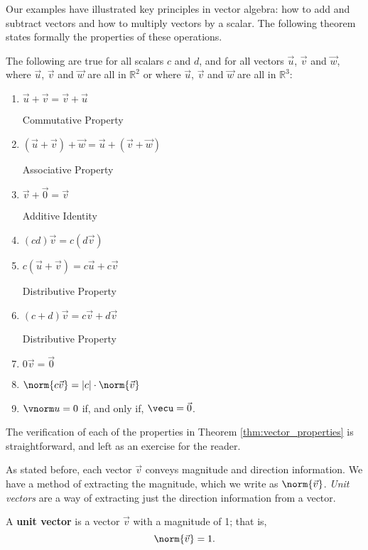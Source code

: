 Our examples have illustrated key principles in vector algebra: how to add and subtract vectors and how to multiply vectors by a scalar. The following theorem states formally the properties of these operations.

{The following are true for all scalars $c$ and $d$, and for all vectors $\vec u$, $\vec v$ and $\vec w$, where $\vec u$, $\vec v$ and $\vec w$ are all in $\mathbb{R}^2$ or where $\vec u$, $\vec v$ and $\vec w$ are all in $\mathbb{R}^3$:
\begin{enumerate}
	\item \parbox{150pt}{$\vec u+\vec v = \vec v+\vec u$}Commutative Property
	\item \parbox{150pt}{$(\vec u+\vec v)+\vec w = \vec u+(\vec v+\vec w)$}Associative Property
	\item \parbox{150pt}{$\vec v+\vec 0 = \vec v$}Additive Identity
	\item \parbox{150pt}{$(cd)\vec v= c(d\vec v)$}
	\item \parbox{150pt}{$c(\vec u+\vec v) = c\vec u+c\vec v$}Distributive Property
	\item \parbox{150pt}{$(c+d)\vec v = c\vec v+d\vec v$}Distributive Property
	\item \parbox{150pt}{$0\vec v = \vec 0$}
	\item	\parbox{150pt}{$\norm{c\vec v} = |c|\cdot\norm{\vec v}$}\label{thm:norm_prop}
	\item	$\vnorm u = 0$ if, and only if, $\vecu = \vec 0$.  \label{thm:zero_norm}
\end{enumerate}
}

%

The verification of each of the properties in Theorem \ref{thm:vector_properties} is straightforward, and left as an exercise for the reader.

As stated before, each vector $\vec v$ conveys magnitude and direction information. We have a method of extracting the magnitude, which we write as $\norm{\vec v}$. \textit{Unit vectors} are a way of extracting just the direction information from a vector.

{A \textbf{unit vector} is a vector $\vec v$ with a magnitude of 1; that is, 
\[
\norm{\vec v}=1.
\]
}

